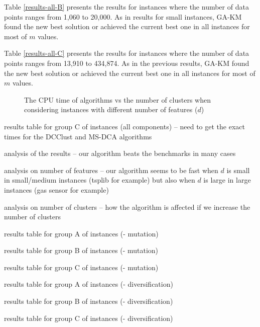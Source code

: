 Table \ref{results-all-B} presents the results for instances where the number of data points ranges from  1,060 to 20,000. As in results for small instances, GA-KM found the new best solution or achieved the current best one in all instances for most of $m$ values.

Table \ref{results-all-C} presents the results for instances where the number of data points ranges from  13,910 to 434,874. As in the previous results, GA-KM found the new best solution or achieved the current best one in all instances for most of $m$ values.


\begin{figure}[h!]
\centering
{}
\caption{The CPU time of algorithms vs the number of clusters when considering instances with different number of features ($d$)}
\end{figure}

\noindent [TO-DO] results table for group C of instances (all components) -- need to get the exact times for the DCClust and MS-DCA algorithms

\noindent [TO-DO] analysis of the results -- our algorithm beats the benchmarks in many cases

\noindent [TO-DO] analysis on number of features -- our algorithm seems to be fast when $d$ is small in small/medium instances (tsplib for example) but also when $d$ is large in large instances (gas sensor for example)

\noindent [TO-DO] analysis on number of clusters -- how the algorithm is affected if we increase the number of clusters

\noindent [TO-DO] results table for group A of instances (- mutation)

\noindent [TO-DO] results table for group B of instances (- mutation)

\noindent [TO-DO] results table for group C of instances (- mutation)

\noindent [TO-DO] results table for group A of instances (- diversification)

\noindent [TO-DO] results table for group B of instances (- diversification)

\noindent [TO-DO] results table for group C of instances (- diversification)